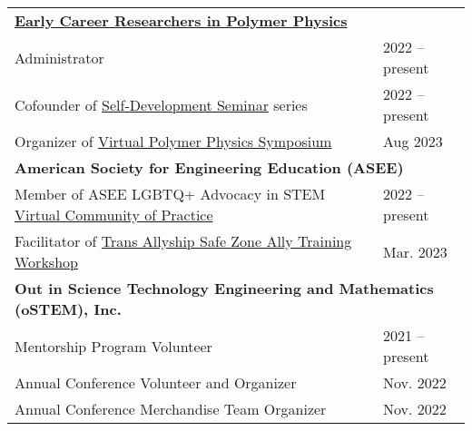 \documentclass[letterpaper,11pt]{article}
\begin{document}
\begin{longtable}{@{}p{}l@{}}
  \multicolumn{2}{l}{\hspace{-3mm} \bf{\href{https://sites.google.com/view/polymerphysics/}{Early Career Researchers in Polymer Physics}}} \\
  \hspace{3mm} Administrator                                                                                                                 & 2022 -- present \\
  \hspace{3mm} Cofounder of \href{https://sites.google.com/view/polymerphysics/self-dev-seminars}{Self-Development Seminar} series                                                                                  & 2022 -- present \\
  \hspace{3mm} Organizer of \href{https://sites.google.com/view/polymerphysics/vpps-2023-schedule}{Virtual Polymer Physics Symposium}                                                                                & Aug 2023 \\[4pt]
  \multicolumn{2}{l}{\hspace{-3mm} \bf{American Society for Engineering Education (ASEE)}} \\
  \hspace{3mm} Member of ASEE LGBTQ+ Advocacy in STEM \href{https://lgbtq.asee.org/our-community/}{Virtual Community of Practice}                                                          & 2022 -- present \\
  \hspace{3mm} Facilitator of \href{https://lgbtq.asee.org/ally-training/online-workshops/#:~:text=Safe\%20Zone\%20Ally\%20Training\%3A\%20Tans\%20Allyship}{Trans Allyship Safe Zone Ally Training Workshop}                                                                & Mar. 2023 \\[4pt]
  \multicolumn{2}{l}{\hspace{-3mm} \bf{Out in Science Technology Engineering and Mathematics (oSTEM), Inc.}} \\
  \hspace{3mm} Mentorship Program Volunteer                                                                                                  & 2021 -- present \\
  \hspace{3mm} Annual Conference Volunteer and Organizer                                                                                     & Nov. 2022 \\
  \hspace{3mm} Annual Conference Merchandise Team Organizer                                                                                  & Nov. 2022 \\

\end{longtable}
\end{document}

